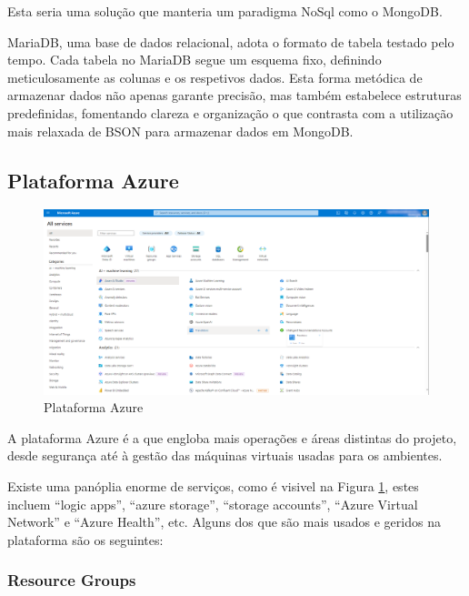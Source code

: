             \label{amazon-web-services}

                Esta seria uma solução que manteria um paradigma NoSql como o MongoDB. 

                MariaDB, uma base de dados relacional, adota o formato de tabela testado pelo tempo. Cada tabela no MariaDB segue um esquema fixo, definindo meticulosamente as colunas e os respetivos dados. Esta forma metódica de armazenar dados não apenas garante precisão, mas também estabelece estruturas predefinidas, fomentando clareza e organização o que contrasta com a utilização mais relaxada de BSON para armazenar dados em MongoDB.

    \subsection{Plataforma Azure}\label{sec:plataforma-azure}

        \begin{figure}[htbp]
            \centering
            \includegraphics[width=\textwidth]{imgs/Azure.png}
            \caption{Plataforma Azure}\label{fig:azure-ui}
        \end{figure}

        A plataforma Azure é a que engloba mais operações e áreas distintas do projeto, desde segurança até à gestão das máquinas virtuais usadas para os ambientes.

        Existe uma panóplia enorme de serviços, como é visivel na Figura \ref{fig:azure-ui}, estes incluem ``logic apps'', ``azure storage'', ``storage accounts'', ``Azure Virtual Network'' e ``Azure Health'', etc. Alguns dos que são mais usados e geridos na plataforma são os seguintes:

        \subsubsection{Resource Groups}

